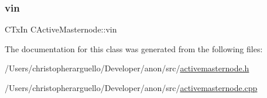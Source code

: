 \mbox{\label{class_c_active_masternode_a0fe32edc638ebd2866dda14fd490d78e}} 
\subsubsection{\texorpdfstring{vin}{vin}}
{\footnotesize\ttfamily C\+Tx\+In C\+Active\+Masternode\+::vin}



The documentation for this class was generated from the following files\+:\begin{DoxyCompactItemize}
\item 
/\+Users/christopherarguello/\+Developer/anon/src/\mbox{\hyperlink{activemasternode_8h}{activemasternode.\+h}}\item 
/\+Users/christopherarguello/\+Developer/anon/src/\mbox{\hyperlink{activemasternode_8cpp}{activemasternode.\+cpp}}\end{DoxyCompactItemize}
